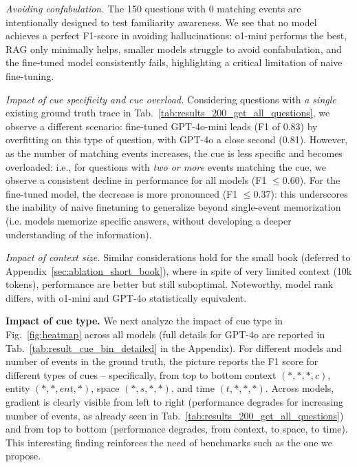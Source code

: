 \documentclass{article}
\newcommand{\ZBH}[1]{\textcolor{green}{#1}}
\begin{document}
\textit{Avoiding confabulation.} The 150 questions with 0 matching events are intentionally designed to test familiarity awareness. We see that no model achieves a perfect F1-score in avoiding hallucinations: o1-mini performs the best,  RAG only minimally helps, smaller models struggle to avoid confabulation, and the fine-tuned model consistently fails, highlighting a critical limitation of naive fine-tuning.

\textit{Impact of cue specificity and cue overload.}
Considering questions with \textit{a single} existing ground truth trace in Tab.~\ref{tab:results_200_get_all_questions}, we observe a different scenario: fine-tuned GPT-4o-mini leads  (F1 of 0.83) by overfitting on this type of question, with GPT-4o a close second (0.81).  However, as the number of matching events increases, the cue is less specific and becomes overloaded: i.e., for questions with \textit{two or more} events matching the cue, we observe a consistent decline in performance for all models (F1 $\le$0.60). For the fine-tuned model, the decrease is more pronounced (F1 $\le$0.37): this underscores the inability of naive finetuning to generalize beyond single-event memorization (i.e. models memorize specific answers, without developing a deeper understanding of the information). 

\textit{Impact of context size.}
Similar considerations hold for the small book (deferred to Appendix~\ref{sec:ablation_short_book}), where in spite of very limited context (10k tokens), performance are better but still suboptimal. Noteworthy, model rank differs, with o1-mini and GPT-4o statistically equivalent.





\noindent \textbf{Impact of cue type.}
We next analyze the impact of cue type in Fig.~\ref{fig:heatmap} across all models (full details for GPT-4o are reported in Tab.~\ref{tab:result_cue_bin_detailed} in the Appendix).
For different models and number of events in the ground truth, 
the picture reports the F1 score for different types of cues -- specifically, from top to bottom context $(*,*,*,c)$, entity  $(*,*,ent,*)$, space $(*,s,*,*)$, and time $(t,*,*,*)$. Across models, gradient is clearly visible from left to right (performance degrades for increasing number of events, as already seen in Tab.~\ref{tab:results_200_get_all_questions}) and from top to bottom (performance degrades, from context, to space, to time). This interesting finding reinforces the need of benchmarks such as the one we propose.
\end{document}

